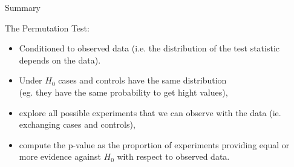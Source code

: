 \documentclass[xcolor={pdftex,dvipsnames,table}]{beamer}
\newcommand{\bb}[1]{\begin{block}{#1}}
\newcommand{\eb}{\end{block}}
\newcommand{\bi}{\begin {itemize}}
\newcommand{\ei}{\end{itemize}}
\newcommand{\bfr}[1]{\begin{frame} \frametitle{#1}}
\begin{document}

\begin{frame}{Summary} 
\bb{The Permutation Test:}
\begin{itemize}
\item Conditioned to observed data (i.e. the distribution of the test statistic depends on the data).
\item Under $H_0$ cases and controls have the same distribution\\(eg. they have the same  probability to get hight values),
\item explore all possible experiments that we can observe with the data (ie. exchanging cases and controls),
\item compute the p-value as the proportion of experiments providing equal or more evidence against $H_0$ with respect to observed data.

\end{itemize}
\eb
\end{frame}
\end{document}
